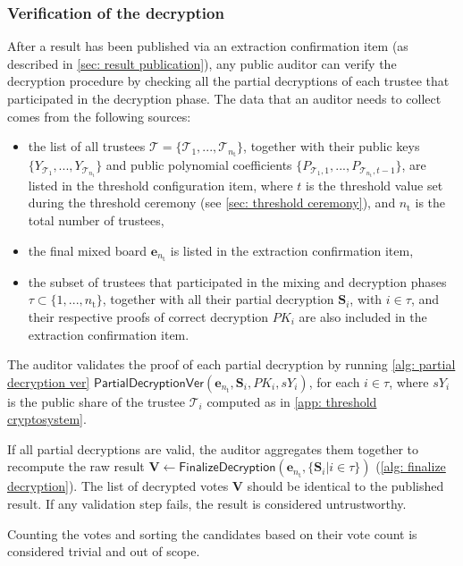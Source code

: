 \subsubsection{Verification of the decryption} \label{sec: verification of decryption}
After a result has been published via an extraction confirmation item (as described in \cref{sec: result publication}), any public auditor can verify the decryption procedure by checking all the partial decryptions of each trustee that participated in the decryption phase. The data that an auditor needs to collect comes from the following sources:
\begin{itemize}
    \item the list of all trustees $\boldsymbol{\mathcal{T}} = \{ \mathcal{T}_1, ..., \mathcal{T}_{n_\mathrm{t}} \}$, together with their public keys $\{ Y_{\mathcal{T}_1}, ..., Y_{\mathcal{T}_{n_\mathrm{t}}} \}$ and public polynomial coefficients $\{ P_{\mathcal{T}_1, 1}, ..., P_{\mathcal{T}_{n_\mathrm{t}}, t-1} \}$, are listed in the threshold configuration item, where $t$ is the threshold value set during the threshold ceremony (see \cref{sec: threshold ceremony}), and $n_\mathrm{t}$ is the total number of trustees,
    \item the final mixed board $\boldsymbol{e}_{n_\mathrm{t}}$ is listed in the extraction confirmation item,
    \item the subset of trustees that participated in the mixing and decryption phases $\tau \subset \{ 1, ..., n_\mathrm{t} \}$, together with all their partial decryption $\boldsymbol{S}_i$, with $i \in \tau$, and their respective proofs of correct decryption $PK_i$ are also included in the extraction confirmation item.
\end{itemize}

The auditor validates the proof of each partial decryption by running \cref{alg: partial decryption ver} $\mathsf{PartialDecryptionVer} (\boldsymbol{e}_{n_\mathrm{t}}, \boldsymbol{S}_i, PK_i, sY_i)$, for each $i \in \tau$, where $sY_i$ is the public share of the trustee $\mathcal{T}_i$ computed as in \cref{app: threshold cryptosystem}.

If all partial decryptions are valid, the auditor aggregates them together to recompute the raw result $\boldsymbol{V} \gets \mathsf{FinalizeDecryption} (\boldsymbol{e}_{n_\mathrm{t}}, \{ \boldsymbol{S}_i | i \in \tau \})$ (\cref{alg: finalize decryption}). The list of decrypted votes $\boldsymbol{V}$ should be identical to the published result. If any validation step fails, the result is considered untrustworthy.

Counting the votes and sorting the candidates based on their vote count is considered trivial and out of scope.
